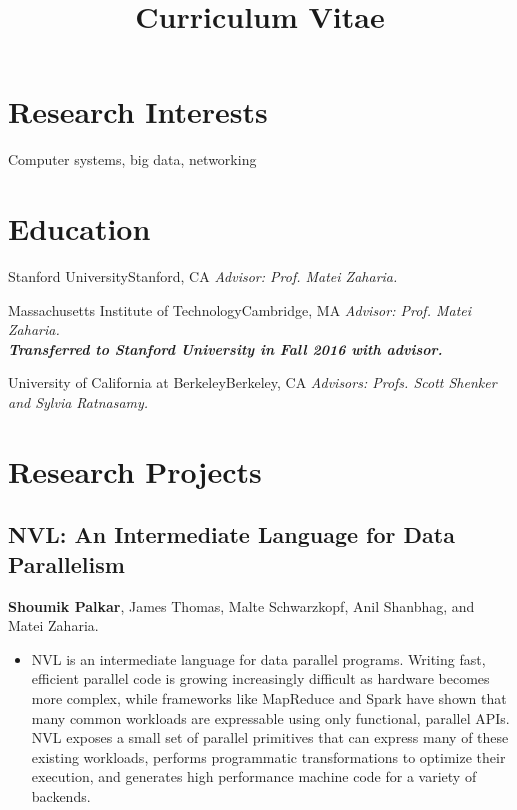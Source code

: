 \documentclass[11pt,letterpaper,sans]{moderncv}
\title{Curriculum Vitae}
\begin{document}
\makecvtitle
\section{Research Interests}
Computer systems, big data, networking

\section{Education}
{Stanford University}{Stanford, CA}{
\emph{Advisor: Prof. Matei Zaharia.}
}{}

{Massachusetts Institute of Technology}{Cambridge, MA}{
\emph{Advisor: Prof. Matei Zaharia.} \\
\textbf{\emph{Transferred to Stanford University in Fall 2016 with advisor.}}
}{}

{University of California at Berkeley}{Berkeley, CA}{
\emph{Advisors: Profs. Scott Shenker and Sylvia Ratnasamy.}
}{}

\section{Research Projects}

\subsection{NVL: An Intermediate Language for Data Parallelism}
\cvitem {}
{
    \textbf{Shoumik Palkar}, James Thomas, Malte Schwarzkopf, Anil Shanbhag, and Matei Zaharia.
    \begin{itemize}
      \item NVL is an intermediate language for data parallel programs. Writing fast, efficient
      parallel code is growing increasingly difficult as hardware becomes more complex,
      while frameworks like MapReduce and Spark have shown that many common workloads are expressable
      using only functional, parallel APIs. NVL exposes a small set of parallel primitives that can
      express many of these existing workloads, performs programmatic transformations to optimize
      their execution, and generates high performance machine code for a variety of backends.
    \end{itemize}
}
\end{document}
